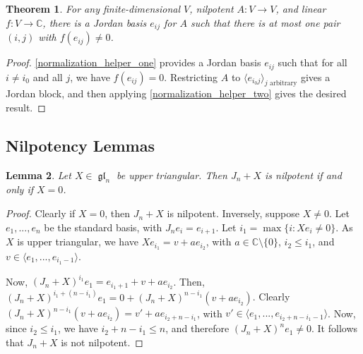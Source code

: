 \documentclass[12pt,psamsfonts]{article}
\DeclareMathOperator{\gl}{\mathfrak{gl}}
\newtheorem{theorem}{Theorem}[section]
\newtheorem{lemma}[theorem]{Lemma}
\begin{document}
\begin{theorem}\label{normalization}
    For any finite-dimensional \(V\), nilpotent \(A : V \to V\), and linear \(f : V \to \mathbb{C}\), there is a Jordan basis \(e_{ij}\) for \(A\) such that there is at most one pair \((i, j)\) with \(f(e_{ij}) \neq 0\).
\end{theorem}
\begin{proof}
    \cref{normalization_helper_one} provides a Jordan basis \(e_{ij}\) such that for all \(i \neq i_0\) and all \(j\), we have \(f(e_{ij}) = 0\).
    Restricting \(A\) to \(\langle e_{i_0j}\rangle_{j \textrm{ arbitrary}}\) gives a Jordan block, and then applying \cref{normalization_helper_two} gives the desired result.
\end{proof}

\subsection{Nilpotency Lemmas}
\begin{lemma}\label{upper_triangle_zero}
    Let \(X \in \gl_n\) be upper triangular.
    Then \(J_n + X\) is nilpotent if and only if \(X = 0\).
\end{lemma}
\begin{proof}
    Clearly if \(X = 0\), then \(J_n + X\) is nilpotent.
    Inversely, suppose \(X \neq 0\).
    Let \(e_1, ..., e_n\) be the standard basis, with \(J_n e_i = e_{i + 1}\).
    Let \(i_1 = \max\{i : Xe_i \neq 0\}\).
    As \(X\) is upper triangular, we have \(X e_{i_1} = v + ae_{i_2}\), with \(a \in \mathbb{C}\setminus\{0\}\), \(i_2 \leq i_1\), and \(v \in \langle e_1, ..., e_{i_1 - 1}\rangle\).
    \par Now, \((J_n + X)^{i_1} e_1 = e_{i_1 + 1} + v + ae_{i_2}\).
    Then, \((J_n + X)^{i_1 + (n - i_1)} e_1 = 0 + (J_n + X)^{n - i_1} (v + ae_{i_2})\).
    Clearly \((J_n + X)^{n - i_1} (v + ae_{i_2}) = v' + ae_{i_2 + n - i_1}\), with \(v' \in \langle e_1, ..., e_{i_2 + n - i_1 - 1} \rangle\).
    Now, since \(i_2 \leq i_1\), we have \(i_2 + n - i_1 \leq n\), and therefore \((J_n + X)^n e_1 \neq 0\).
    It follows that \(J_n + X\) is not nilpotent.
\end{proof}
\end{document}
